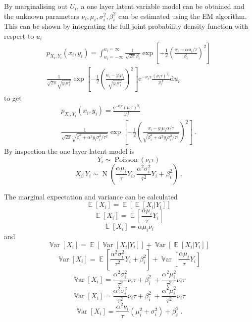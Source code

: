 \documentclass[12pt]{report}
\DeclareMathOperator{\expectation}{\mathbb{E}}
\DeclareMathOperator{\variance}{\mathbb{V}ar}
\DeclareMathOperator{\normal}{N}
\DeclareMathOperator{\poisson}{Poisson}
\newcommand{\euler}{\mathrm{e}}
\newcommand{\diff}{\mathrm{d}}
\begin{document}
By marginalising out $U_i$, a one layer latent variable model can be obtained and the unknown parameters $\nu_i,\mu_i,\sigma_i^2,\beta_i^2$ can be estimated using the EM algorithm. This can be shown by integrating the full joint probability density function with respect to $u_i$
\begin{multline}
p_{X_i,Y_i}\left(x_i,y_i\right)=\int_{u_i=-\infty}^{u_i=\infty}
\frac{1}{\sqrt{2\pi}\beta_i}\exp\left[-\frac{1}{2}\left(\frac{x_i-\alpha u_i /\tau}{\beta_i}\right)^2\right]
\\
\frac{1}{\sqrt{2\pi}\sqrt{y_i\sigma_i^2}}\exp\left[-\frac{1}{2}\left(\frac{u_i-y_i\mu_i}{\sqrt{y_i\sigma_i^2}}\right)^2\right]
\euler^{-\nu_i\tau}\frac{(\nu_i\tau)^{y_i}}{y_i!} \diff u_i
\end{multline}
to get
\begin{multline}
p_{X_i,Y_i}\left(x_i,y_i\right)=
\frac{\euler^{-\nu_i\tau}(\nu_i\tau)^{y_i}}{y_i!}
\\
\frac{1}{\sqrt{2\pi}\sqrt{\beta_i^2+\alpha^2y_i\sigma_i^2/\tau^2}}
\exp\left[-\frac{1}{2}\left(\frac{x_i-y_i\mu_i\alpha/\tau}{\sqrt{\beta_i^2+\alpha^2y_i\sigma_i^2/\tau^2}}\right)^2\right] \ .
\end{multline}
By inspection the one layer latent model is
\begin{equation}
Y_i\sim\poisson(\nu_i\tau)
\end{equation}
\begin{equation}
X_i|Y_i\sim\normal\left(
\frac{\alpha\mu_i}{\tau}Y_i,\frac{\alpha^2\sigma_i^2}{\tau^2}Y_i+\beta_i^2
\right) \ .
\end{equation}

The marginal expectation and variance can be calculated
\begin{equation}
\expectation[X_i]=\expectation[\expectation[X_i|Y_i]]
\end{equation}
\begin{equation}
\expectation[X_i]=\expectation\left[\frac{\alpha\mu_i}{\tau}Y_i\right]
\end{equation}
\begin{equation}
\expectation[X_i] = \alpha \mu_i \nu_i
\end{equation}
and
\begin{equation}
\variance[X_i] = \expectation[\variance[X_i|Y_i]] + \variance[\expectation[X_i|Y_i]]
\end{equation}
\begin{equation}
\variance[X_i] = \expectation\left[\frac{\alpha^2\sigma_i^2}{\tau^2}Y_i+\beta_i^2\right] + \variance\left[\frac{\alpha\mu_i}{\tau}Y_i\right]
\end{equation}
\begin{equation}
\variance[X_i] =
\frac{\alpha^2\sigma_i^2}{\tau^2}\nu_i\tau+\beta_i^2\
+\frac{\alpha^2\mu_i^2}{\tau^2}\nu_i\tau
\end{equation}
\begin{equation}
\variance[X_i] =
\frac{\alpha^2\sigma_i^2}{\tau^2}\nu_i\tau+\beta_i^2\
+\frac{\alpha^2\mu_i^2}{\tau^2}\nu_i\tau
\end{equation}
\begin{equation}
\variance[X_i] = \frac{\alpha^2\nu_i}{\tau}\left(\mu_i^2+\sigma_i^2\right)+\beta_i^2 \ .
\end{equation}
\end{document}
